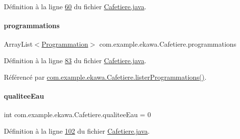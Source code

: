 Définition à la ligne \hyperlink{_cafetiere_8java_source_l00060}{60} du fichier \hyperlink{_cafetiere_8java_source}{Cafetiere.\+java}.

\mbox{\label{classcom_1_1example_1_1ekawa_1_1_cafetiere_a987c8e1bcea506b65f4b05f955b3f699}} 
\paragraph{\texorpdfstring{programmations}{programmations}}
{\footnotesize\ttfamily Array\+List$<$\hyperlink{classcom_1_1example_1_1ekawa_1_1_programmation}{Programmation}$>$ com.\+example.\+ekawa.\+Cafetiere.\+programmations\hspace{0.3cm}{\ttfamily [private]}}



Définition à la ligne \hyperlink{_cafetiere_8java_source_l00083}{83} du fichier \hyperlink{_cafetiere_8java_source}{Cafetiere.\+java}.



Référencé par \hyperlink{_cafetiere_8java_source_l00846}{com.\+example.\+ekawa.\+Cafetiere.\+lister\+Programmations()}.

\mbox{\label{classcom_1_1example_1_1ekawa_1_1_cafetiere_a27aba2ce49934d0bf7b2d2230b3003d7}} 
\paragraph{\texorpdfstring{qualitee\+Eau}{qualiteeEau}}
{\footnotesize\ttfamily int com.\+example.\+ekawa.\+Cafetiere.\+qualitee\+Eau = 0\hspace{0.3cm}{\ttfamily [private]}}



Définition à la ligne \hyperlink{_cafetiere_8java_source_l00102}{102} du fichier \hyperlink{_cafetiere_8java_source}{Cafetiere.\+java}.



